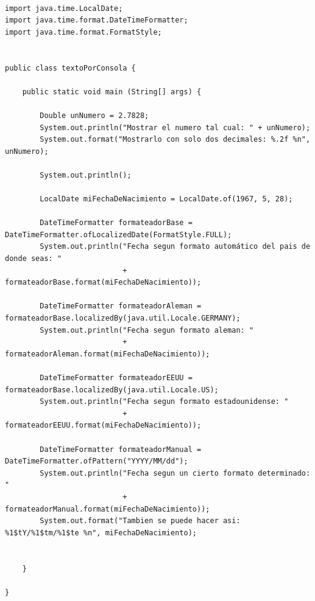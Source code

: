 \documentclass[spanish,12pt,a4paper,final,oneside]{book}
\begin{document}
\begin{lstlisting}[frame=single, caption=lenguaje java]

import java.time.LocalDate;
import java.time.format.DateTimeFormatter;
import java.time.format.FormatStyle;


public class textoPorConsola {
	
    public static void main (String[] args) {
        
        Double unNumero = 2.7828;
        System.out.println("Mostrar el numero tal cual: " + unNumero);
        System.out.format("Mostrarlo con solo dos decimales: %.2f %n", unNumero);
        
        System.out.println();
       
        LocalDate miFechaDeNacimiento = LocalDate.of(1967, 5, 28);

        DateTimeFormatter formateadorBase = DateTimeFormatter.ofLocalizedDate(FormatStyle.FULL);
        System.out.println("Fecha segun formato automático del pais de donde seas: "
                           + formateadorBase.format(miFechaDeNacimiento));

        DateTimeFormatter formateadorAleman = formateadorBase.localizedBy(java.util.Locale.GERMANY);
        System.out.println("Fecha segun formato aleman: "
                           + formateadorAleman.format(miFechaDeNacimiento));
             
        DateTimeFormatter formateadorEEUU = formateadorBase.localizedBy(java.util.Locale.US);
        System.out.println("Fecha segun formato estadounidense: "
                           + formateadorEEUU.format(miFechaDeNacimiento));

        DateTimeFormatter formateadorManual = DateTimeFormatter.ofPattern("YYYY/MM/dd");
        System.out.println("Fecha segun un cierto formato determinado: "
                           + formateadorManual.format(miFechaDeNacimiento));
        System.out.format("Tambien se puede hacer asi: %1$tY/%1$tm/%1$te %n", miFechaDeNacimiento); 


    }
    
}
\end{lstlisting}
\end{document}
